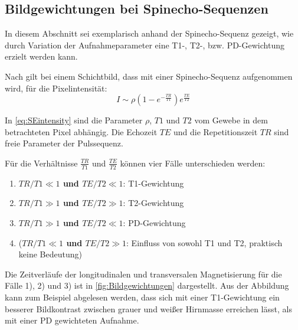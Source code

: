\subsection{Bildgewichtungen bei Spinecho-Sequenzen}
\label{sec:gewichtung}
In diesem Abschnitt sei exemplarisch anhand der Spinecho-Sequenz gezeigt, wie durch Variation der Aufnahmeparameter eine T1-, T2-, bzw. PD-Gewichtung erzielt werden kann.

Nach \cite{Bushberg2011} gilt bei einem Schichtbild, dass mit einer Spinecho-Sequenz aufgenommen wird, für die Pixelintensität:
\begin{equation}
\label{eq:SEintensity}
	I \sim \rho \left(1-e^{-\frac{TR}{T1}}\right) e^{\frac{TE}{T2}}
\end{equation}

In \autoref{eq:SEintensity} sind die Parameter $\rho$, $T1$ und $T2$ vom Gewebe in dem betrachteten Pixel abhängig. Die Echozeit $TE$ und die Repetitionszeit $TR$ sind freie Parameter der Pulssequenz.

Für die Verhältnisse $\frac{TR}{T1}$ und $\frac{TE}{T2}$ können vier Fälle unterschieden werden:

\begin{enumerate}
	\item \textbf{$TR/T1\ll1$ und $TE/T2\ll1$}: T1-Gewichtung
	\item \textbf{$TR/T1\gg1$ und $TE/T2\gg1$}: T2-Gewichtung
	\item \textbf{$TR/T1\gg1$ und $TE/T2\ll1$}: PD-Gewichtung
	\item (\textbf{$TR/T1\ll1$ und $TE/T2\gg1$}: Einfluss von sowohl T1 und T2, praktisch keine Bedeutung)
\end{enumerate}
Die Zeitverläufe der longitudinalen und transversalen Magnetisierung für die Fälle 1), 2) und 3) ist in \autoref{fig:Bildgewichtungen} dargestellt. Aus der Abbildung kann zum Beispiel abgelesen werden, dass sich mit einer T1-Gewichtung ein besserer Bildkontrast zwischen grauer und weißer Hirnmasse erreichen lässt, als mit einer PD gewichteten Aufnahme.

